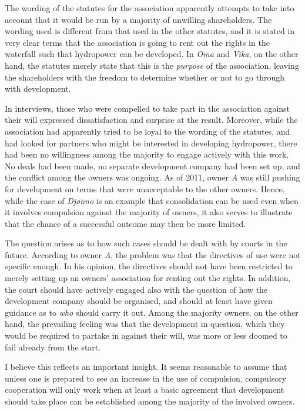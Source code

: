 The wording of the statutes for the association apparently attempts to take into account that it would be run by a majority of unwilling shareholders. The wording used is different from that used in the other statutes, and it is stated in very clear terms that the association is going to rent out the rights in the waterfall such that hydropower can be developed. In \emph{Oma} and \emph{Vika}, on the other hand, the statutes merely state that this is the \emph{purpose} of the association, leaving the shareholders with the freedom to determine whether or not to go through with development.

In interviews, those who were compelled to take part in the association against their will expressed dissatisfaction and surprise at the result. Moreover, while the association had apparently tried to be loyal to the wording of the statutes, and had looked for partners who might be interested in developing hydropower, there had been no willingness among the majority to engage actively with this work. No deals had been made, no separate development company had been set up, and the conflict among the owners was ongoing. As of 2011, owner $A$ was still pushing for development on terms that were unacceptable to the other owners. Hence, while the case of \emph{Djønno} is an example that consolidation can be used even when it involves compulsion against the majority of owners, it also serves to illustrate that the chance of a successful outcome may then be more limited.

The question arises as to how such cases should be dealt with by courts in the future. According to owner $A$, the problem was that the directives of use were not specific enough. In his opinion, the directives should not have been restricted to merely setting up an owners' association for renting out the rights. In addition, the court should have actively engaged also with the question of how the development company should be organised, and should at least have given guidance as to \emph{who} should carry it out. Among the majority owners, on the other hand, the prevailing feeling was that the development in question, which they would be required to partake in against their will, was more or less doomed to fail already from the start.

I believe this reflects an important insight. It seems reasonable to assume that unless one is prepared to see an increase in the use of compulsion, compulsory cooperation will only work when at least a basic agreement that development should take place can be established among the majority of the involved owners.

